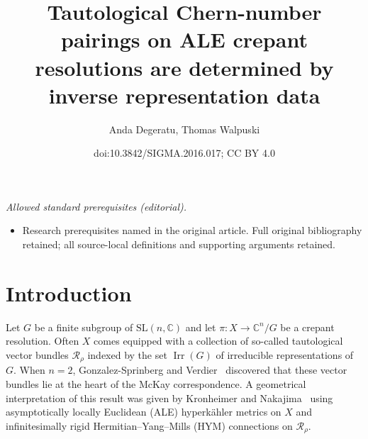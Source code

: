 \documentclass[10pt,a4paper]{amsart}
\title{Tautological Chern-number pairings on ALE crepant resolutions are determined by inverse representation data}
\author{Anda Degeratu, Thomas Walpuski}
\date{doi:10.3842/SIGMA.2016.017; CC BY 4.0}
\numberwithin{equation}{section}
\newcommand{\sR}{\mathscr{R}}
\newcommand{\C}{{\mathbb C}}
\newcommand{\SL}{\mathrm{SL}}
\newcommand{\Irr}{\operatorname{Irr}}
\begin{document}
\maketitle
\noindent\textit{Allowed standard prerequisites (editorial).}\begin{itemize}
\item Research prerequisites named in the original article. Full original bibliography retained; all source-local definitions and supporting arguments retained.
\end{itemize}\medskip
\section{Introduction}
\label{sec:intro}

Let $G$ be a f\/inite subgroup of $\SL(n,\C)$ and let $\pi\colon X \to
\C^n\!/G$ be a crepant resolution.
Often $X$ comes equipped with a collection of so-called tautological vector
bundles $\sR_\rho$ indexed by the set $\Irr(G)$ of irreducible
representations of $G$.
When $n=2$,  Gonzalez-Sprinberg and Verdier~\cite{GonzalezSprinberg1983} discovered that these
vector bundles lie at the heart of the McKay
correspondence.
A geometrical interpretation of this result was given
by Kronheimer and Nakajima~\cite{Kronheimer1990} using asymptotically
locally Euclidean (ALE) hyperk\"ahler metrics on $X$ and inf\/initesimally
rigid Hermitian--Yang--Mills (HYM) connections on $\sR_\rho$.
\end{document}
